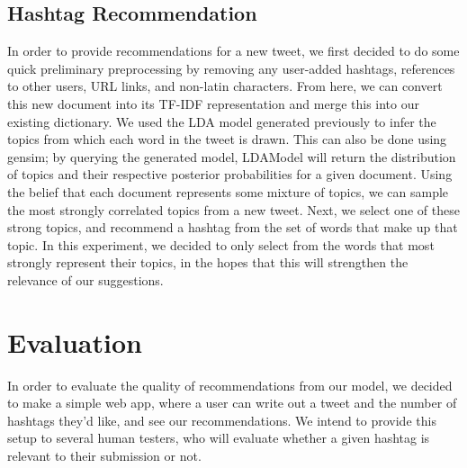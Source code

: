 \documentclass{acm_proc_article-sp}
\begin{document}
\subsection{Hashtag Recommendation}
\hspace*{5mm}In order to provide recommendations for a new tweet, we first decided to do some quick preliminary preprocessing by removing any user-added hashtags, references to other users, URL links, and non-latin characters. From here, we can convert this new document into its TF-IDF representation and merge this into our existing dictionary. We used the LDA model generated previously to infer the topics from which each word in the tweet is drawn. This can also be done using gensim; by querying the generated model, LDAModel will return the distribution of topics and their respective posterior probabilities for a given document. Using the belief that each document represents some mixture of topics, we can sample the most strongly correlated topics from a new tweet. Next, we select one of these strong topics, and recommend a hashtag from the set of words that make up that topic. In this experiment, we decided to only select from the words that most strongly represent their topics, in the hopes that this will strengthen the relevance of our suggestions.\\

\section{Evaluation}
\hspace*{5mm}In order to evaluate the quality of recommendations from our model, we decided to make a  simple web app, where a user can write out a tweet and the number of hashtags they'd like, and see our recommendations. We intend to provide this setup to several human testers, who will evaluate whether a given hashtag is relevant to their submission or not.\\


\end{document}
